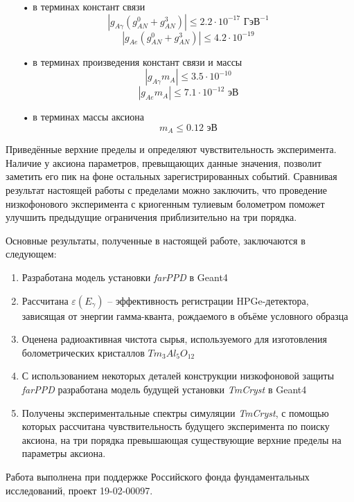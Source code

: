 \documentclass[a4paper,article,14pt]{extarticle}
\begin{document}
\begin{enumerate}
    \item[•] в терминах констант связи
    \begin{equation}
         \left| g_{A\gamma}{\left( {g_{AN}^0 + g_{AN}^3} \right)} \right| \leqslant 2.2 \cdot 10^{-17} \text{ ГэВ}^{-1}
    \end{equation}
    \begin{equation}
         \left| g_{Ae}{\left( {g_{AN}^0 + g_{AN}^3} \right)} \right| \leqslant 4.2 \cdot 10^{-19}
    \end{equation}
    \item[•] в терминах произведения констант связи и массы
    \begin{equation}
        \left| {{g_{A\gamma}}{m_A}} \right| \leqslant 3.5 \cdot 10^{-10}
    \end{equation}
    \begin{equation}
        \left| {{g_{Ae}}{m_A}} \right| \leqslant 7.1 \cdot 10^{-12} \text{ эВ}
    \end{equation}
    \item[•] в терминах массы аксиона
    \begin{equation}
        m_A \leqslant 0.12 \text{ эВ}
    \end{equation}
\end{enumerate}

Приведённые верхние пределы и определяют чувствительность эксперимента. Наличие у аксиона параметров, превыщающих данные значения, позволит заметить его пик на фоне остальных зарегистрированных событий. Сравнивая результат настоящей работы с пределами \cite{newlimits_tm} можно заключить, что проведение низкофонового эксперимента с криогенным тулиевым болометром поможет улучшить предыдущие ограничения приблизительно на три порядка.

Основные результаты, полученные в настоящей работе, заключаются в следующем:

\begin{enumerate}
    \item Разработана модель установки \textit{farPPD} в Geant4
    \item Рассчитана $\varepsilon \left( E_{\gamma} \right)$ -- эффективность регистрации HPGe-детектора, зависящая от энергии гамма-кванта, рождаемого в объёме условного образца
    \item Оценена радиоактивная чистота сырья, используемого для изготовления болометрических кристаллов $Tm_3Al_5O_{12}$
    \item С использованием некоторых деталей конструкции низкофоновой защиты \textit{farPPD} разработана модель будущей установки \textit{TmCryst} в Geant4
    \item Получены экспериментальные спектры симуляции \textit{TmCryst}, с помощью которых рассчитана чувствительность будущего эксперимента по поиску аксиона, на три порядка превышающая существующие верхние пределы на параметры аксиона.
    \end{enumerate}
    
Работа выполнена при поддержке Российского фонда фундаментальных исследований, проект 19-02-00097.
    

\newpage

\printbibliography[title={Источники}]{}
\end{document}

